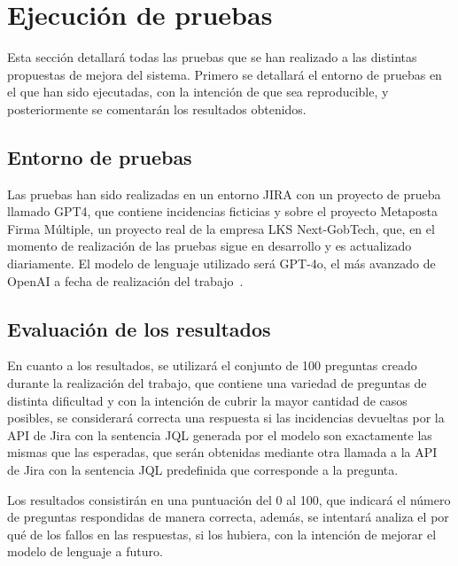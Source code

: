 \section{Ejecución de pruebas}
Esta sección detallará todas las pruebas que se han realizado a las distintas propuestas de mejora del sistema. Primero se detallará el entorno de pruebas en el que han sido ejecutadas, con la intención de que sea reproducible, y posteriormente se comentarán los resultados obtenidos.

\subsection{Entorno de pruebas}
Las pruebas han sido realizadas en un entorno JIRA con un proyecto de prueba llamado GPT4, que contiene incidencias ficticias y sobre el proyecto Metaposta Firma Múltiple, un proyecto real de la empresa LKS Next-GobTech, que, en el momento de realización de las pruebas sigue en desarrollo y es actualizado diariamente. El modelo de lenguaje utilizado será GPT-4o, el más avanzado de OpenAI a fecha de realización del trabajo~\cite{gpt4o}. 

\subsection{Evaluación de los resultados}
En cuanto a los resultados, se utilizará el conjunto de 100 preguntas creado durante la realización del trabajo, que contiene una variedad de preguntas de distinta dificultad y con la intención de cubrir la mayor cantidad de casos posibles, se considerará correcta una respuesta si las incidencias devueltas por la API de Jira con la sentencia JQL generada por el modelo son exactamente las mismas que las esperadas, que serán obtenidas mediante otra llamada a la API de Jira con la sentencia JQL predefinida que corresponde a la pregunta.

Los resultados consistirán en una puntuación del 0 al 100, que indicará el número de preguntas respondidas de manera correcta, además, se intentará analiza el por qué de los fallos en las respuestas, si los hubiera, con la intención de mejorar el modelo de lenguaje a futuro.